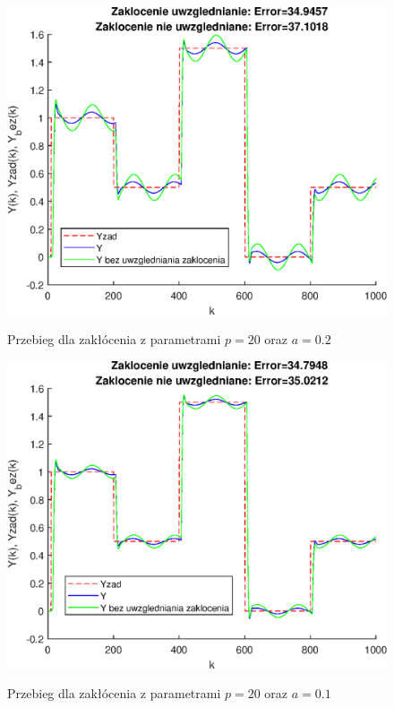\begin{figure}[h!]
	\centering
	\includegraphics[scale=1]{Rys/sin20_5}
	\label{fig:sin20_5}
	\caption{Przebieg dla zakłócenia z parametrami $p=20$ oraz $a=0.2$}
\end{figure}
\begin{figure}[h!]
	\centering
	\includegraphics[scale=1]{Rys/sin20_10}
	\label{fig:sin20_10}
	\caption{Przebieg dla zakłócenia z parametrami $p=20$ oraz $a=0.1$}
\end{figure}